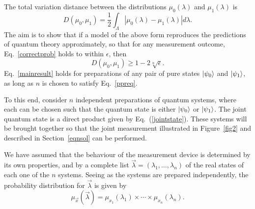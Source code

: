 \documentclass[amsmath,amssymb,superscriptaddress,twocolumn,pra]{revtex4-1}
\newcommand{\abs}[1]{\left\lvert{#1}\right\rvert}
\begin{document}
The total variation distance between the distributions $\mu_0(\lambda)$ and $\mu_1(\lambda)$ is
\[
D(\mu_0,\mu_1) = \frac12\int_\Lambda \abs{\mu_0(\lambda) - \mu_1(\lambda)}d\lambda.
\]
The aim is to show that if a model of the above form reproduces the predictions of quantum theory approximately, so that for any measurement outcome, Eq.~\eqref{correctprob} holds to within $\epsilon$, then
\begin{equation}\label{mainresult}
  D(\mu_0,\mu_1) \geq 1 - 2\sqrt[n]{\epsilon}.
\end{equation} 
Eq.~\eqref{mainresult} holds for preparations of any pair of pure states $\ket{\psi_0}$ and $\ket{\psi_1}$, as long as $n$ is chosen to satisfy Eq.~\eqref{ppreq}.

To this end, consider $n$ independent preparations of quantum systems, where each can be chosen such that the quantum state is either $\ket{\psi_0}$ or $\ket{\psi_1}$. The joint quantum state is a direct product given by Eq.~(\ref{jointstate}). These systems will be brought together so that the joint measurement illustrated in Figure~\ref{fig2} and described in Section~\ref{eqnsol} can be performed. 

We have assumed that the behaviour of the measurement device is determined by its own properties, and by a complete list $\vec{\lambda} = (\lambda_1,\ldots,\lambda_n)$ of the real states of each one of the $n$ systems. Seeing as the systems are prepared independently, the probability distribution for $\vec{\lambda}$ is given by
\begin{equation}\label{productass}
\mu_{\vec{x}}(\vec{\lambda}) = \mu_{x_1}(\lambda_1)\times\cdots\times \mu_{x_n}(\lambda_n).
\end{equation}
\end{document}
